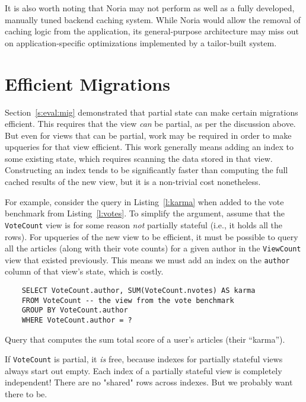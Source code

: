 It is also worth noting that Noria may not perform as well as a fully developed,
manually tuned backend caching system. While Noria would allow the removal of
caching logic from the application, its general-purpose architecture may miss
out on application-specific optimizations implemented by a tailor-built system.

\section{Efficient Migrations}

Section~\ref{s:eval:mig} demonstrated that partial state can make certain
migrations efficient. This requires that the view \emph{can} be partial, as
per the discussion above. But even for views that can be partial, work may be
required in order to make upqueries for that view efficient. This work generally
means adding an index to some existing state, which requires scanning the data
stored in that view. Constructing an index tends to be significantly faster than
computing the full cached results of the new view, but it is a non-trivial cost
nonetheless.

For example, consider the query in Listing~\vref{l:karma} when added to the vote
benchmark from Listing~\vref{l:votes}. To simplify the argument, assume that the
\texttt{VoteCount} view is for some reason \emph{not} partially stateful (i.e.,
it holds all the rows). For upqueries of the new view to be efficient, it must
be possible to query all the articles (along with their vote counts) for a given
author in the \texttt{ViewCount} view that existed previously. This means we
must add an index on the \texttt{author} column of that view's state, which is
costly.

\begin{listing}[h]
  \begin{verbatim}
    SELECT VoteCount.author, SUM(VoteCount.nvotes) AS karma
    FROM VoteCount -- the view from the vote benchmark
    GROUP BY VoteCount.author
    WHERE VoteCount.author = ?
  \end{verbatim}
  \caption{Query that computes the sum total score of a user's articles
  (their ``karma'').}
  \label{l:karma}
\end{listing}

\begin{inprogress}
  If \texttt{VoteCount} is partial, it \emph{is} free, because indexes for
  partially stateful views always start out empty. Each index of a partially
  stateful view is completely independent! There are no "shared" rows across
  indexes. But we probably want there to be.
\end{inprogress}

